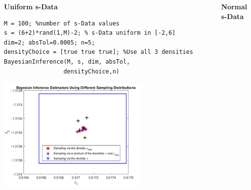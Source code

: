 \documentclass[final,mathserif]{beamer}
\newcommand{\blue}[1]{{\color{myblue}#1}}
\renewcommand{\blue}{\textcolor{blue!80!black}}
\begin{document}
\begin{frame}[fragile]
\begin{columns}[t]
\begin{column}{.31\linewidth}
\begin{block}{\Large \textbf{\blue {Uniform s-Data}}}
\lstset{basicstyle=\small} 
\begin{lstlisting}  
M = 100; %number of s-Data values
s = (6+2)*rand(1,M)-2; % s-Data uniform in [-2,6]
dim=2; absTol=0.0005; n=5;
densityChoice = [true true true]; %Use all 3 densities
BayesianInference(M, s, dim, absTol, 
                 densityChoice,n)
\end{lstlisting}    

\vspace{.1in}

\begin{center}
\end{center}

\vspace{.1in}

\begin{center}
\includegraphics[width=0.7\textwidth]{UniformRandom}
\end{center} 
\end{block}
\end{column}

\begin{column}{.015\linewidth} \end{column} %

\begin{column}{.31\linewidth}
\begin{block}{\Large \textbf{\blue {Normal s-Data}}}    


\end{block}
\end{column}
\end{columns}
\end{frame}
\end{document}
